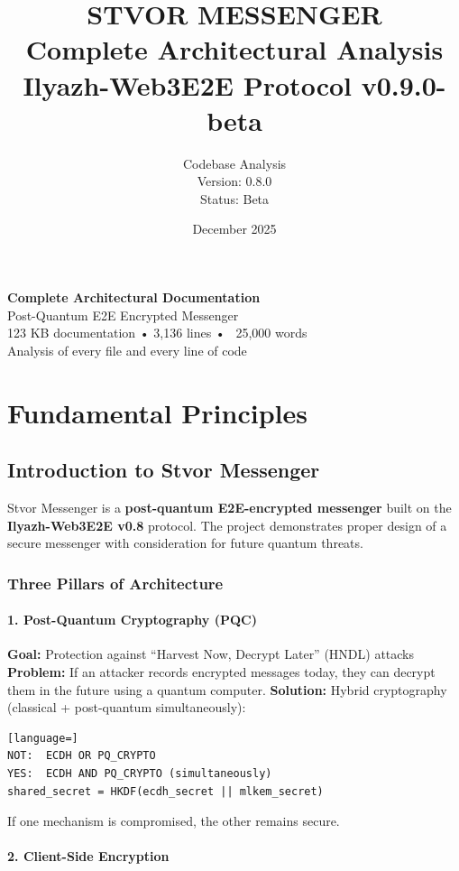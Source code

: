 \documentclass[11pt,a4paper,oneside]{book}
\title{%
  \textbf{STVOR MESSENGER} \\
    {\large Complete Architectural Analysis} \\
    {\large Ilyazh-Web3E2E Protocol v0.9.0-beta}
}
\author{%
  Codebase Analysis \\
    Version: 0.8.0 \\
  Status: Beta
}
\date{December 2025}
\begin{document}
\maketitle
\begin{center}
  \Large{\textbf{Complete Architectural Documentation}} \\
    Post-Quantum E2E Encrypted Messenger \\
    123 KB documentation • 3,136 lines • ~25,000 words \\
  Analysis of every file and every line of code
\end{center}
\tableofcontents
\pagebreak
\vspace{-1cm}\part{Fundamental Principles}
\vspace{-0.5cm}\chapter{Introduction to Stvor Messenger}
Stvor Messenger is a \textbf{post-quantum E2E-encrypted messenger} built on the \textbf{Ilyazh-Web3E2E v0.8} protocol. The project demonstrates proper design of a secure messenger with consideration for future quantum threats.
\vspace{-0.3cm}\section{Three Pillars of Architecture}
\vspace{-0.2cm}\subsection{1. Post-Quantum Cryptography (PQC)}
\textbf{Goal:} Protection against ``Harvest Now, Decrypt Later'' (HNDL) attacks
\textbf{Problem:} If an attacker records encrypted messages today, they can decrypt them in the future using a quantum computer.
\textbf{Solution:} Hybrid cryptography (classical + post-quantum simultaneously):
\begin{lstlisting}[language=]
NOT:  ECDH OR PQ_CRYPTO
YES:  ECDH AND PQ_CRYPTO (simultaneously)
shared_secret = HKDF(ecdh_secret || mlkem_secret)
\end{lstlisting}
If one mechanism is compromised, the other remains secure.
\vspace{-0.2cm}\subsection{2. Client-Side Encryption}
\end{document}
